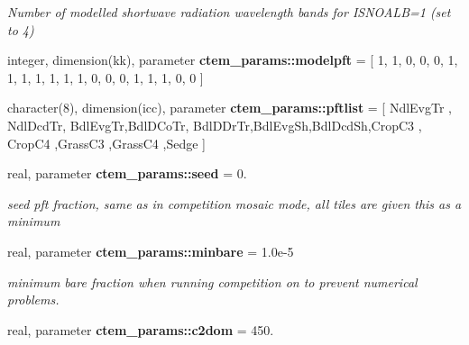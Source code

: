 \begin{DoxyCompactItemize}
\begin{DoxyCompactList}\small\item\em Number of modelled shortwave radiation wavelength bands for I\+S\+N\+O\+A\+L\+B=1 (set to 4) \end{DoxyCompactList}\item 
\hypertarget{namespacectem__params_af53120baccb346b1743b085b6b254026}{}integer, dimension(kk), parameter {\bfseries ctem\+\_\+params\+::modelpft} = \mbox{[} 1, 1, 0, 0, 0, 1, 1, 1, 1, 1, 1, 1, 0, 0, 0, 1, 1, 1, 0, 0 \mbox{]}\label{namespacectem__params_af53120baccb346b1743b085b6b254026}

\item 
\hypertarget{namespacectem__params_acbc2ae92278687bbfae38ba501904140}{}character(8), dimension(icc), parameter {\bfseries ctem\+\_\+params\+::pftlist} = \mbox{[} \textquotesingle{}Ndl\+Evg\+Tr\textquotesingle{} , \textquotesingle{}Ndl\+Dcd\+Tr\textquotesingle{}, \textquotesingle{}Bdl\+Evg\+Tr\textquotesingle{},\textquotesingle{}Bdl\+D\+Co\+Tr\textquotesingle{}, \textquotesingle{}Bdl\+D\+Dr\+Tr\textquotesingle{},\textquotesingle{}Bdl\+Evg\+Sh\textquotesingle{},\textquotesingle{}Bdl\+Dcd\+Sh\textquotesingle{},\textquotesingle{}Crop\+C3 \textquotesingle{}, \textquotesingle{}Crop\+C4 \textquotesingle{},\textquotesingle{}Grass\+C3 \textquotesingle{},\textquotesingle{}Grass\+C4 \textquotesingle{},\textquotesingle{}Sedge \textquotesingle{} \mbox{]}\label{namespacectem__params_acbc2ae92278687bbfae38ba501904140}

\item 
\hypertarget{namespacectem__params_ac9f4780ce317911fbf6daa45a90a8dad}{}real, parameter {\bfseries ctem\+\_\+params\+::seed} = 0.\label{namespacectem__params_ac9f4780ce317911fbf6daa45a90a8dad}

\begin{DoxyCompactList}\small\item\em seed pft fraction, same as in competition  mosaic mode, all tiles are given this as a minimum \end{DoxyCompactList}\item 
\hypertarget{namespacectem__params_a4e93696e56f999aa1005c61d4ed25789}{}real, parameter {\bfseries ctem\+\_\+params\+::minbare} = 1.\+0e-\/5\label{namespacectem__params_a4e93696e56f999aa1005c61d4ed25789}

\begin{DoxyCompactList}\small\item\em minimum bare fraction when running competition on to prevent numerical problems. \end{DoxyCompactList}\item 
\hypertarget{namespacectem__params_a6acddc90acef172ea5a361fd7e628696}{}real, parameter {\bfseries ctem\+\_\+params\+::c2dom} = 450.\label{namespacectem__params_a6acddc90acef172ea5a361fd7e628696}


\end{DoxyCompactItemize}
